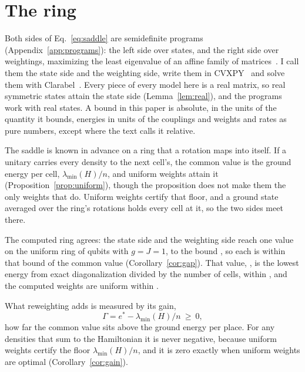 \documentclass[aps,prd,reprint,superscriptaddress]{revtex4-2}
\begin{document}
\section{The ring}
\label{sec:ring}

Both sides of Eq.~\eqref{eq:saddle} are semidefinite programs (Appendix~\ref{app:programs}): the left side over states, and the right side over weightings, maximizing the least eigenvalue of an affine family of matrices~\cite{Overton1988,LewisOverton1996,BoydVandenberghe2004}. I call them the state side and the weighting side, write them in CVXPY~\cite{DiamondBoyd2016} and solve them with Clarabel~\cite{GoulartChen2024}. Every piece of every model here is a real matrix, so real symmetric states attain the state side (Lemma~\ref{lem:real}), and the programs work with real states. A bound in this paper is absolute, in the units of the quantity it bounds, energies in units of the couplings and weights and rates as pure numbers, except where the text calls it relative.

The saddle is known in advance on a ring that a rotation maps into itself. If a unitary carries every density to the next cell's, the common value is the ground energy per cell, $\lambda_{\min}(H)/n$, and uniform weights attain it (Proposition~\ref{prop:uniform}), though the proposition does not make them the only weights that do. Uniform weights certify that floor, and a ground state averaged over the ring's rotations holds every cell at it, so the two sides meet there.

The computed ring agrees: the state side and the weighting side reach one value on the uniform ring of  qubits with $g = J = 1$, to the bound , so each is within that bound of the common value (Corollary~\ref{cor:gap}). That value, , is the lowest energy from exact diagonalization divided by the number of cells, within , and the computed weights are uniform within .

What reweighting adds is measured by its gain,
\begin{equation}
  \Gamma = e^* - \lambda_{\min}(H)/n \ \ge\ 0 ,
  \label{eq:gain}
\end{equation}
how far the common value sits above the ground energy per place. For any densities that sum to the Hamiltonian it is never negative, because uniform weights certify the floor $\lambda_{\min}(H)/n$, and it is zero exactly when uniform weights are optimal (Corollary~\ref{cor:gain}).
\end{document}
